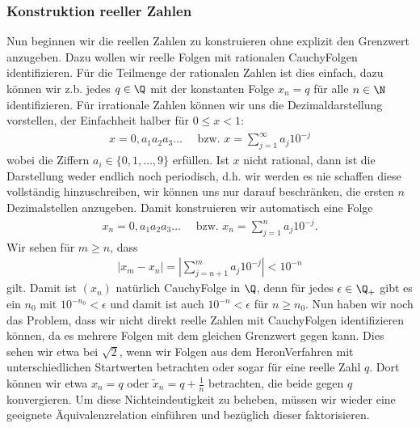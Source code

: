 \documentclass[letterpaper,10pt,english]{jupyterBook}
\begin{document}
\subsubsection{Konstruktion reeller Zahlen}
\label{\detokenize{grundlagen/zahlensysteme:konstruktion-reeller-zahlen}}
Nun beginnen wir die reellen Zahlen zu konstruieren ohne explizit den Grenzwert anzugeben. Dazu wollen wir reelle Folgen mit rationalen Cauchy\sphinxhyphen{}Folgen identifizieren. Für die Teilmenge der rationalen Zahlen ist dies einfach, dazu können wir z.b. jedes \(q \in \Q\) mit der konstanten Folge \(x_n = q\) für alle \(n \in \N\) identifizieren. Für irrationale Zahlen können wir uns die Dezimaldarstellung vorstellen, der Einfachheit halber für \(0\leq x <1\):
\begin{equation*}
\begin{split}x = 0,a_1a_2a_3 \ldots  \quad \text{ bzw. } x=\sum_{j=1}^\infty a_j 10^{-j}\end{split}
\end{equation*}
wobei die Ziffern \(a_i \in \{0,1,\ldots,9\}\) erfüllen. Ist \(x\) nicht rational, dann ist die Darstellung weder endlich noch periodisch, d.h. wir werden es nie schaffen diese vollständig hinzuschreiben, wir können uns nur darauf beschränken, die ersten \(n\) Dezimalstellen anzugeben. Damit konstruieren wir automatisch eine Folge
\begin{equation*}
\begin{split}x_n = 0,a_1a_2a_3 \ldots  \quad \text{ bzw. } x_n=\sum_{j=1}^n a_j 10^{-j} .\end{split}
\end{equation*}
Wir sehen für \(m \geq n\), dass
\begin{equation*}
\begin{split}|x_m -x_n| = | \sum_{j=n+1}^m a_j 10^{-j}| < 10^{-n}\end{split}
\end{equation*}
gilt. Damit ist \((x_n)\) natürlich Cauchy\sphinxhyphen{}Folge in \(\Q\), denn für jedes \(\epsilon \in \Q_+\) gibt es ein \(n_0\) mit
\(10^{-n_0} < \epsilon \) und damit ist auch \(10^{-n} < \epsilon\) für \(n \geq n_0\).
Nun haben wir noch das Problem, dass wir nicht direkt reelle Zahlen mit Cauchy\sphinxhyphen{}Folgen identifizieren können, da es mehrere Folgen mit dem gleichen Grenzwert gegen kann. Dies sehen wir etwa bei \(\sqrt{2}\), wenn wir Folgen aus dem Heron\sphinxhyphen{}Verfahren mit unterschiedlichen Startwerten betrachten oder sogar für eine reelle Zahl \(q\). Dort können wir etwa \(x_n=q\) oder \(\tilde x_n = q +\frac{1}n\) betrachten, die beide gegen \(q\) konvergieren. Um diese Nichteindeutigkeit zu beheben, müssen wir wieder eine geeignete Äquivalenzrelation einführen und bezüglich dieser faktorisieren.
\end{document}
